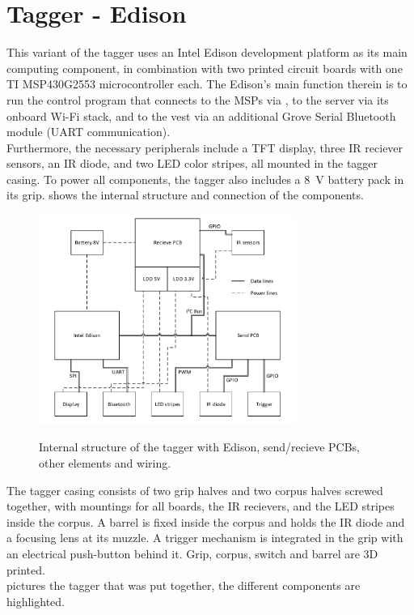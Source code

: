 \chapter{Tagger - Edison}
This variant of the tagger uses an Intel Edison development platform as its main computing component, in combination 
with two printed circuit boards with one TI MSP430G2553 microcontroller each. The Edison's main function therein is to 
run the control program that connects to the MSPs via \isqc, to the server via its onboard Wi-Fi stack, and to the vest
via an additional Grove Serial Bluetooth module (UART communication).\\
Furthermore, the necessary peripherals include a  TFT display, three IR reciever sensors, an IR diode, 
and two LED color stripes, all mounted in the tagger casing. To power all components, the tagger also includes a 
\SI{8}{\volt} battery pack in its grip.
 shows the internal structure and connection of the components.

\begin{figure}[h!]
\centering
\includegraphics[width=0.75\textwidth]{images/edison_tagger_struct.pdf}\\
\caption[Edison Tagger Structure]{Internal structure of the tagger with Edison, send/recieve PCBs, other elements and wiring.}
\label{fig:tag_ed_structure}
\end{figure}

The tagger casing consists of two grip halves and two corpus halves screwed together, with mountings for all boards, 
the IR recievers, and the LED stripes inside the corpus. A barrel is fixed inside the corpus and holds the IR diode and 
a focusing lens at its muzzle. A trigger mechanism is integrated in the grip with an electrical push-button behind it. 
Grip, corpus, switch and barrel are 3D printed.\\
 pictures the tagger that was put together, the different components are highlighted.

